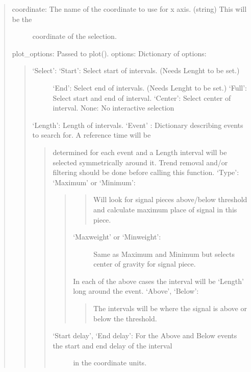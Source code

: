 \documentclass[letterpaper,10pt,english]{sphinxmanual}
\begin{document}
\begin{fulllineitems}
\begin{quote}
\begin{description}
\item[{coordinate: The name of the coordinate to use for x axis. (string) This will be the}] \leavevmode
coordinate of the selection.

\end{description}

plot\_options: Passed to plot().
options: Dictionary of options:
\begin{quote}
\begin{description}
\item[{‘Select’: ‘Start’: Select start of intervals. (Needs Lenght to be set.)}] \leavevmode
‘End’: Select end of intervals. (Needs Lenght to be set.)
‘Full’: Select start and end of interval.
‘Center’: Select center of interval.
None: No interactive selection

\end{description}

‘Length’: Length of intervals.
‘Event’ : Dictionary describing events to search for. A reference time will be
\begin{quote}

determined for each event and a Length interval will be selected
symmetrically around it. Trend removal and/or filtering should be done
before calling this function.
‘Type’: ‘Maximum’ or ‘Minimum’:
\begin{quote}
\begin{quote}

Will look for signal pieces above/below threshold
and calculate maximum place of signal in this piece.
\end{quote}
\begin{description}
\item[{‘Max\sphinxhyphen{}weight’ or ‘Min\sphinxhyphen{}weight’:}] \leavevmode
Same as Maximum and Minimum but selects center of gravity
for signal piece.

\end{description}

In each of the above cases the interval will be ‘Length’ long around the event.
‘Above’, ‘Below’:
\begin{quote}

The intervals will be where the signal is above or below the threshold.
\end{quote}
\end{quote}
\begin{description}
\item[{‘Start delay’, ‘End delay’: For the Above and Below events the start and end delay of the interval}] \leavevmode
in the coordinate units.


\end{description}
\end{quote}
\end{quote}
\end{quote}
\end{fulllineitems}
\end{document}
